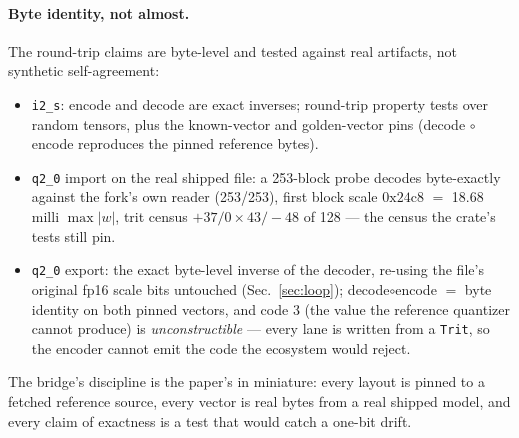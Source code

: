 \paragraph{Byte identity, not almost.}
The round-trip claims are byte-level and tested against real
artifacts, not synthetic self-agreement:

\begin{itemize}
\item \texttt{i2\_s}: encode and decode are exact inverses; round-trip
  property tests over random tensors, plus the known-vector and
  golden-vector pins (decode$\,\circ\,$encode reproduces the pinned
  reference bytes).
\item \texttt{q2\_0} import on the real shipped file: a 253-block
  probe decodes byte-exactly against the fork's own reader
  (253/253), first block scale $0\mathrm{x}24\mathrm{c}8$ $=$ 18.68
  milli $\max|w|$, trit census $+37 / 0{\times}43 / -48$ of 128 ---
  the census the crate's tests still pin.
\item \texttt{q2\_0} export: the exact byte-level inverse of the
  decoder, re-using the file's original fp16 scale bits untouched
  (Sec.~\ref{sec:loop}); decode$\circ$encode $=$ byte identity on
  both pinned vectors, and code 3 (the value the reference quantizer
  cannot produce) is \emph{unconstructible} --- every lane is written
  from a \texttt{Trit}, so the encoder cannot emit the code the
  ecosystem would reject.
\end{itemize}

The bridge's discipline is the paper's in miniature: every layout is
pinned to a fetched reference source, every vector is real bytes from
a real shipped model, and every claim of exactness is a test that
would catch a one-bit drift.
